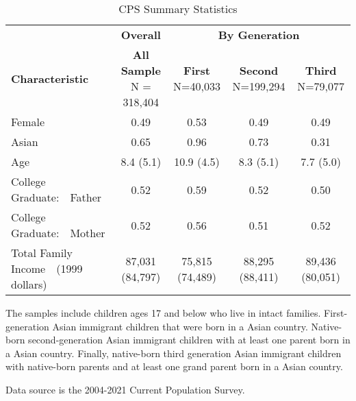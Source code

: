 \begin{table}[H]
\centering
\caption{CPS Summary Statistics \label{tab:sumstat1}}
\centering
\begin{threeparttable}
\begin{tabular}[t]{lcccc}
\toprule
\multicolumn{1}{c}{ } & \multicolumn{1}{c}{\textbf{Overall}} & \multicolumn{3}{c}{\textbf{By Generation}} \\
\cmidrule(l{3pt}r{3pt}){2-2} \cmidrule(l{3pt}r{3pt}){3-5}
\textbf{Characteristic} & \makecell[c]{\textbf{All Sample} \\N = 318,404} & \makecell[c]{\textbf{First} \\N=40,033} & \makecell[c]{\textbf{Second} \\N=199,294} & \makecell[c]{\textbf{Third} \\N=79,077}\\
\midrule
Female & 0.49 & 0.53 & 0.49 & 0.49\\
Asian & 0.65 & 0.96 & 0.73 & 0.31\\
Age & 8.4 (5.1) & 10.9 (4.5) & 8.3 (5.1) & 7.7 (5.0)\\
College Graduate:\ \ 	 Father & 0.52 & 0.59 & 0.52 & 0.50\\
College Graduate:\ \ 	 Mother & 0.52 & 0.56 & 0.51 & 0.52\\
Total Family Income\ \ 	 (1999 dollars) & 87,031 (84,797) & 75,815 (74,489) & 88,295 (88,411) & 89,436 (80,051)\\
\bottomrule
\end{tabular}
\begin{tablenotes}
\item[1] The samples include children ages 17 and below who live in intact families. First-generation Asian immigrant children that were born in a Asian country. Native-born second-generation Asian immigrant children with at least one parent born in a Asian country. Finally, native-born third generation Asian immigrant children with native-born parents and at least one grand parent born in a Asian country.
\item[2] Data source is the 2004-2021 Current Population Survey.
\end{tablenotes}
\end{threeparttable}
\end{table}
